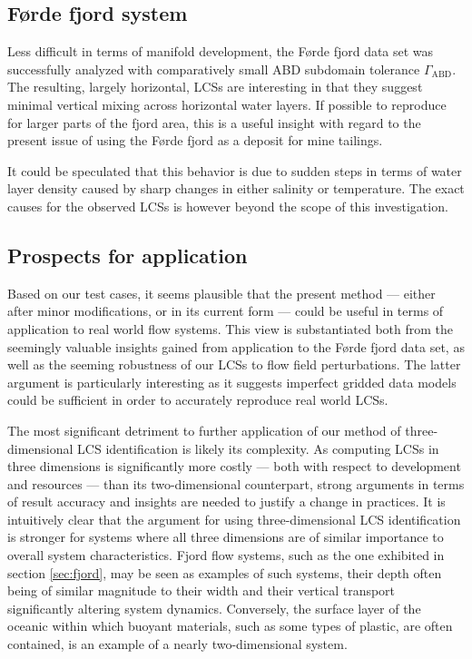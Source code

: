 \subsection{Førde fjord system}\label{sec:discussion_fjord}

Less difficult in terms of manifold development, the Førde fjord data set was successfully analyzed with comparatively small ABD subdomain tolerance $\Gamma_{\text{ABD}}$. The resulting, largely horizontal, LCSs are interesting in that they suggest minimal vertical mixing across horizontal water layers. If possible to reproduce for larger parts of the fjord area, this is a useful insight with regard to the present issue of using the Førde fjord as a deposit for mine tailings.

It could be speculated that this behavior is due to sudden steps in terms of water layer density caused by sharp changes in either salinity or temperature. The exact causes for the observed LCSs is however beyond the scope of this investigation. 

\subsection{Prospects for application}\label{sec:discussion_application}

Based on our test cases, it seems plausible that the present method --- either after minor modifications, or in its current form --- could be useful in terms of application to real world flow systems. This view is substantiated both from the seemingly valuable insights gained from application to the Førde fjord data set, as well as the seeming robustness of our LCSs to flow field perturbations. The latter argument is particularly interesting as it suggests imperfect gridded data models could be sufficient in order to accurately reproduce real world LCSs.

The most significant detriment to further application of our method of three-dimensional LCS identification is likely its complexity. As computing LCSs in three dimensions is significantly more costly --- both with respect to development and resources --- than its two-dimensional counterpart, strong arguments in terms of result accuracy and insights are needed to justify a change in practices. It is intuitively clear that the argument for using three-dimensional LCS identification is stronger for systems where all three dimensions are of similar importance to overall system characteristics. Fjord flow systems, such as the one exhibited in section \ref{sec:fjord}, may be seen as examples of such systems, their depth often being of similar magnitude to their width and their vertical transport significantly altering system dynamics. Conversely, the surface layer of the oceanic within which buoyant materials, such as some types of plastic, are often contained, is an example of a nearly two-dimensional system.


